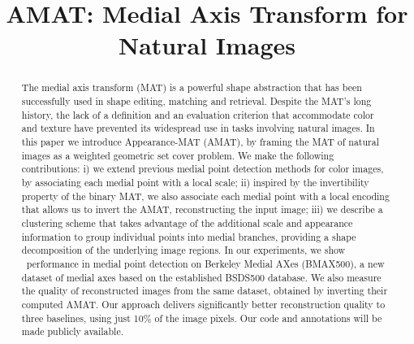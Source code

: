 \documentclass[10pt,twocolumn,letterpaper]{article}
\begin{document}
\title{AMAT: Medial Axis Transform for Natural Images}
\maketitle


\begin{abstract}
The medial axis transform (MAT) is a powerful shape abstraction that has been successfully
used in shape editing, matching and retrieval. 
Despite the MAT's long history, the lack of a definition and an evaluation criterion 
that accommodate color and texture have prevented its widespread use in tasks involving natural images.
In this paper we introduce Appearance-MAT (AMAT), by framing the MAT 
of natural images as a weighted geometric set cover problem.
We make the following contributions: 
i) we extend previous medial point detection methods for color images,
by associating each medial point with a local scale; 
ii) inspired by the invertibility property of the binary MAT, we also associate each medial point with a local encoding
that allows us to invert the AMAT, reconstructing the input image; 
iii) we describe a clustering scheme that takes advantage of the additional scale and appearance information 
to group individual points into medial branches, providing a shape decomposition of the underlying image regions.
In our experiments, we show \sota\ performance in medial point detection on
Berkeley Medial AXes (BMAX500), a new dataset of medial axes based on the established BSDS500 database.
We also measure the quality of reconstructed images from the same dataset,
obtained by inverting their computed AMAT.
Our approach delivers significantly better reconstruction quality \wrt to three baselines,
using just 10\% of the image pixels. 
Our code and annotations will be made publicly available.
\end{abstract}


\end{document}
